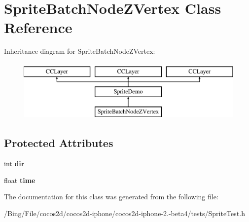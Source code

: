 \hypertarget{interface_sprite_batch_node_z_vertex}{\section{Sprite\-Batch\-Node\-Z\-Vertex Class Reference}
\label{interface_sprite_batch_node_z_vertex}
}
Inheritance diagram for Sprite\-Batch\-Node\-Z\-Vertex\-:\begin{figure}[H]
\begin{center}
\leavevmode
\includegraphics[height=3.000000cm]{interface_sprite_batch_node_z_vertex}
\end{center}
\end{figure}
\subsection*{Protected Attributes}
\begin{DoxyCompactItemize}
\item 
\hypertarget{interface_sprite_batch_node_z_vertex_a8708152103580d76f861c6eeb58f3235}{int {\bfseries dir}}\label{interface_sprite_batch_node_z_vertex_a8708152103580d76f861c6eeb58f3235}

\item 
\hypertarget{interface_sprite_batch_node_z_vertex_a656c0aae56e8578ac956254dd14c8a3b}{float {\bfseries time}}\label{interface_sprite_batch_node_z_vertex_a656c0aae56e8578ac956254dd14c8a3b}

\end{DoxyCompactItemize}


The documentation for this class was generated from the following file\-:\begin{DoxyCompactItemize}
\item 
/\-Bing/\-File/cocos2d/cocos2d-\/iphone/cocos2d-\/iphone-\/2.-\/beta4/tests/Sprite\-Test.\-h\end{DoxyCompactItemize}
